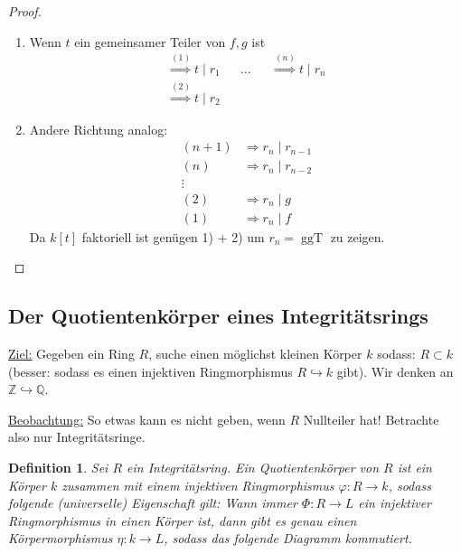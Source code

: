 \documentclass[a4paper,12pt,numbers=noenddot,parskip=full]{scrartcl}
\newcommand{\setZ}{\mathbb{Z}}
\newcommand{\setQ}{\mathbb{Q}}
\newcommand{\heading}{\underline}
\theoremstyle{dotless}
\newtheorem{definition}[theorem]{Definition}
\theoremstyle{remark}
\begin{document}
	\begin{proof}
		\begin{enumerate}
			\item Wenn $t$ ein gemeinsamer Teiler von $f,g$ ist
			\begin{align*}
				\overset{(1)}{\Longrightarrow} t \mid r_1 && \dots && \overset{(n)}{\Longrightarrow} t \mid r_n \\
				\overset{(2)}{\Longrightarrow} t \mid r_2
			\end{align*}
			\item Andere Richtung analog:
			\begin{align*}
				(n+1) &\Longrightarrow r_n \mid r_{n-1} \\
				(n) &\Longrightarrow r_n \mid r_{n-2} \\
				\vdots \\
				(2) &\Longrightarrow r_n \mid g \\
				(1) &\Longrightarrow r_n \mid f
			\end{align*}
			Da $k[t]$ faktoriell ist genügen 1) + 2) um $r_n = \operatorname{ggT}$ zu zeigen.
		\end{enumerate}
	\end{proof}

	\subsection{Der Quotientenkörper eines Integritätsrings}
	
	\heading{Ziel:} Gegeben ein Ring $R$, suche einen möglichst kleinen Körper $k$ sodass: $R \subset k$ (besser: sodass es einen injektiven Ringmorphismus $R \hookrightarrow k$ gibt). Wir denken an $\setZ \hookrightarrow \setQ$.
	
	\heading{Beobachtung:} So etwas kann es nicht geben, wenn $R$ Nullteiler hat! Betrachte also nur Integritätsringe.
	
	\begin{definition}
		Sei $R$ ein Integritätsring. Ein Quotientenkörper von $R$ ist ein Körper $k$ zusammen mit einem injektiven Ringmorphismus $\varphi: R \to k$, sodass folgende (universelle) Eigenschaft gilt: Wann immer $\Phi: R \to L$ ein injektiver Ringmorphismus in einen Körper ist, dann gibt es genau einen Körpermorphismus $\eta: k \to L$, sodass das folgende Diagramm kommutiert.
		
		\begin{center}
		\end{center}
	\end{definition}
\end{document}
